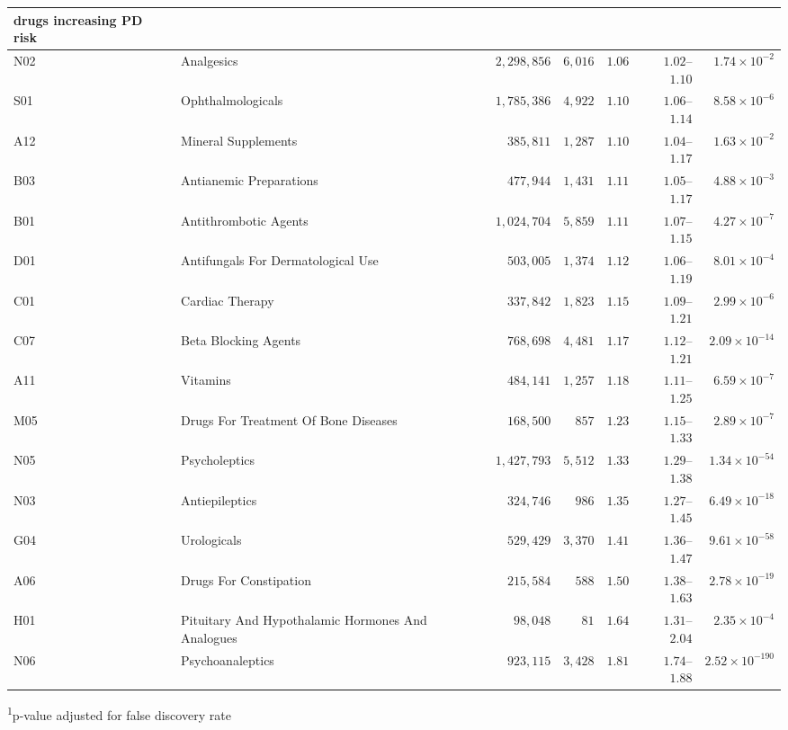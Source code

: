 \begin{longtable}{llrrrrr}
\midrule
\multicolumn{1}{l}{drugs increasing PD risk} \\ 
\midrule
N02 & Analgesics & $2,298,856$ & $6,016$ & $1.06$ & $1.02$–$1.10$ & $1.74 \times 10^{-2}$ \\ 
S01 & Ophthalmologicals & $1,785,386$ & $4,922$ & $1.10$ & $1.06$–$1.14$ & $8.58 \times 10^{-6}$ \\ 
A12 & Mineral Supplements & $385,811$ & $1,287$ & $1.10$ & $1.04$–$1.17$ & $1.63 \times 10^{-2}$ \\ 
B03 & Antianemic Preparations & $477,944$ & $1,431$ & $1.11$ & $1.05$–$1.17$ & $4.88 \times 10^{-3}$ \\ 
B01 & Antithrombotic Agents & $1,024,704$ & $5,859$ & $1.11$ & $1.07$–$1.15$ & $4.27 \times 10^{-7}$ \\ 
D01 & Antifungals For Dermatological Use & $503,005$ & $1,374$ & $1.12$ & $1.06$–$1.19$ & $8.01 \times 10^{-4}$ \\ 
C01 & Cardiac Therapy & $337,842$ & $1,823$ & $1.15$ & $1.09$–$1.21$ & $2.99 \times 10^{-6}$ \\ 
C07 & Beta Blocking Agents & $768,698$ & $4,481$ & $1.17$ & $1.12$–$1.21$ & $2.09 \times 10^{-14}$ \\ 
A11 & Vitamins & $484,141$ & $1,257$ & $1.18$ & $1.11$–$1.25$ & $6.59 \times 10^{-7}$ \\ 
M05 & Drugs For Treatment Of Bone Diseases & $168,500$ & $857$ & $1.23$ & $1.15$–$1.33$ & $2.89 \times 10^{-7}$ \\ 
N05 & Psycholeptics & $1,427,793$ & $5,512$ & $1.33$ & $1.29$–$1.38$ & $1.34 \times 10^{-54}$ \\ 
N03 & Antiepileptics & $324,746$ & $986$ & $1.35$ & $1.27$–$1.45$ & $6.49 \times 10^{-18}$ \\ 
G04 & Urologicals & $529,429$ & $3,370$ & $1.41$ & $1.36$–$1.47$ & $9.61 \times 10^{-58}$ \\ 
A06 & Drugs For Constipation & $215,584$ & $588$ & $1.50$ & $1.38$–$1.63$ & $2.78 \times 10^{-19}$ \\ 
H01 & Pituitary And Hypothalamic Hormones And Analogues & $98,048$ & $81$ & $1.64$ & $1.31$–$2.04$ & $2.35 \times 10^{-4}$ \\ 
N06 & Psychoanaleptics & $923,115$ & $3,428$ & $1.81$ & $1.74$–$1.88$ & $2.52 \times 10^{-190}$ \\ 
\bottomrule
\end{longtable}
\begin{minipage}{\linewidth}
\textsuperscript{1}p-value adjusted for false discovery rate\\
\end{minipage}

